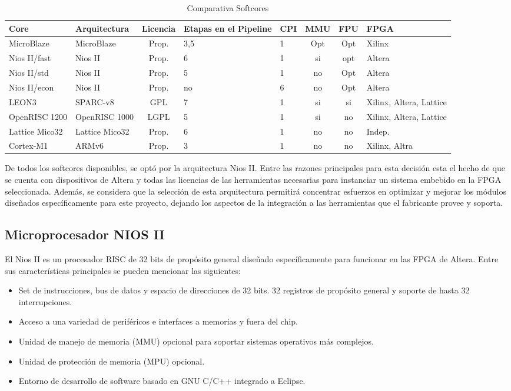 \begin{table}[h]
	 \begin{tabular}{|p{1.65cm}|p{1.98cm}|c|p{1.4cm}|p{0.6cm}|c|c|p{1.3cm}|} \hline
		Core & Arquitectura & Licencia & Etapas en el Pipeline & CPI & MMU & FPU & FPGA \\ \hline
		MicroBlaze & MicroBlaze & Prop. & 3,5 & 1 & Opt & Opt & Xilinx\\ \hline
		Nios II/fast & Nios II & Prop. & 6 & 1 & si & opt & Altera \\ \hline
		Nios II/std & Nios II & Prop. & 5 & 1 & no & Opt & Altera \\ \hline
		Nios II/econ & Nios II & Prop. & no & 6 & no & Opt & Altera \\ \hline
		LEON3 & SPARC-v8 & GPL & 7 & 1 & si & si & Xilinx, Altera, Lattice \\ \hline
		OpenRISC 1200 & OpenRISC 1000 & LGPL & 5 & 1 & si & no & Xilinx, Altera, Lattice \\ \hline
		Lattice Mico32 & Lattice Mico32 & Prop. & 6 & 1 & no & no & Indep. \\ \hline
		Cortex-M1 & ARMv6 & Prop. & 3 & 1 & no & no & Xilinx, Altra \\ \hline
	\end{tabular}
		\caption{Comparativa Softcores}
	\label{tab:comp}
\end{table}

De todos los softcores disponibles, se optó por la arquitectura Nios II. Entre las razones principales para esta decisión esta el hecho de que se cuenta con dispositivos de Altera y todas las licencias de las herramientas necesarias para instanciar un sistema embebido en la FPGA seleccionada. Además, se considera que la selección de esta arquitectura permitirá concentrar esfuerzos en optimizar y mejorar los módulos diseñados específicamente para este proyecto, dejando los aspectos de la integración a las herramientas que el fabricante provee y soporta.
\subsection{Microprocesador NIOS II}
El Nios II es un procesador RISC de 32 bits de propósito general diseñado específicamente para funcionar en las FPGA de Altera. Entre sus características principales se pueden mencionar las siguientes:

\begin{itemize}
	\item Set de instrucciones, bus de datos y espacio de direcciones de 32 bits. 32 registros de propósito general y soporte de hasta 32 interrupciones.
	\item Acceso a una variedad de periféricos e interfaces a memorias y fuera del chip.
	\item Unidad de manejo de memoria (MMU) opcional para soportar sistemas operativos más complejos.
	\item Unidad de protección de memoria (MPU) opcional.
	\item Entorno de desarrollo de software basado en GNU C/C++ integrado a Eclipse.
\end{itemize}

